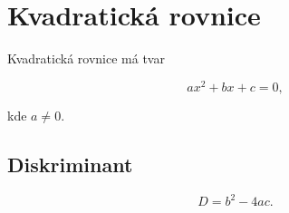 \section{Kvadratická rovnice}

Kvadratická rovnice má tvar

\[
ax^2 + bx + c = 0,
\]

kde \(a \neq 0\).

\subsection{Diskriminant}

\[
D = b^2 - 4ac.
\]